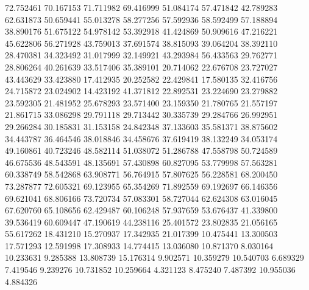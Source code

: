 72.752461
70.167153
71.711982
69.416999
51.084174
57.471842
42.789283
62.631873
50.659441
55.013278
58.277256
57.592936
58.592499
57.188894
38.890176
51.675122
54.978142
53.392918
41.424869
50.909616
47.216221
45.622806
56.271928
43.759013
37.691574
38.815093
39.064204
38.392110
28.470381
34.323492
31.017999
32.149921
43.293984
56.433563
29.762771
28.806264
40.261639
33.517406
35.389101
20.714062
22.676708
23.727027
43.443629
33.423880
17.412935
20.252582
22.429841
17.580135
32.416756
24.715872
23.024902
14.423192
41.371812
22.892531
23.224690
23.279882
23.592305
21.481952
25.678293
23.571400
23.159350
21.780765
21.557197
21.861715
33.086298
29.791118
29.713442
30.335739
29.284766
26.992951
29.266284
30.185831
31.153158
24.842348
37.133603
35.581371
38.875602
34.443787
36.464546
38.018846
34.458676
37.619419
38.132249
34.053174
49.160861
40.723246
48.582114
51.038072
51.286788
47.558798
50.724589
46.675536
48.543591
48.135691
57.430898
60.827095
53.779998
57.563281
60.338749
58.542868
63.908771
56.764915
57.807625
56.228581
68.200450
73.287877
72.605321
69.123955
65.354269
71.892559
69.192697
66.146356
69.621041
68.806166
73.720734
57.083301
58.727044
62.624308
63.016045
67.620760
65.108656
62.429487
60.106248
57.937659
53.676437
41.339800
39.536419
60.609447
47.190619
44.238116
25.401572
23.802835
21.056165
55.617262
18.431210
15.270937
17.342935
21.017399
10.475441
13.300503
17.571293
12.591998
17.308933
14.774415
13.036080
10.871370
8.030164
10.233631
9.285388
13.808739
15.176314
9.902571
10.359279
10.540703
6.689329
7.419546
9.239276
10.731852
10.259664
4.321123
8.475240
7.487392
10.955036
4.884326
